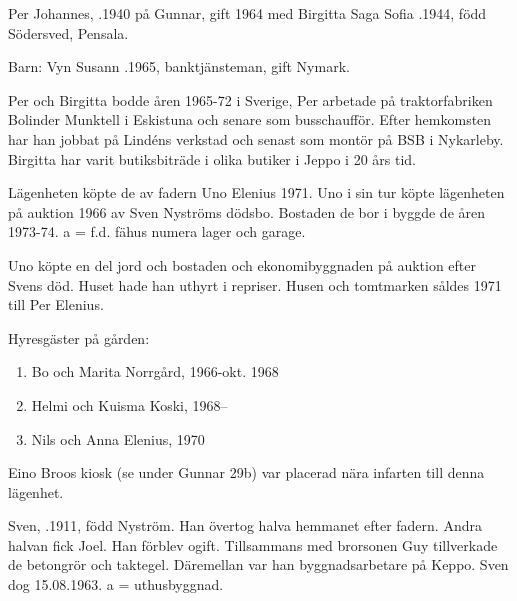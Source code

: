 
%
Per Johannes, .1940 på Gunnar, gift 1964 med Birgitta Saga Sofia .1944, född Södersved, Pensala.

Barn: Vyn Susann .1965, banktjänsteman, gift Nymark.

Per och Birgitta bodde åren 1965-72 i Sverige, Per arbetade på traktorfabriken Bolinder Munktell i Eskistuna och senare som busschaufför. Efter hemkomsten har han jobbat på Lindéns verkstad och senast som montör på BSB i Nykarleby. Birgitta har varit butiksbiträde i olika butiker i Jeppo i 20 års tid.

Lägenheten köpte de av fadern Uno Elenius 1971. Uno i sin tur köpte lägenheten på auktion 1966 av Sven Nyströms dödsbo. Bostaden de bor i byggde de åren 1973-74.  a = f.d. fähus numera lager och garage.



%



%
Uno köpte en del jord och bostaden och ekonomibyggnaden på auktion efter Svens död. Huset hade han uthyrt i repriser. Husen och tomtmarken såldes 1971 till Per Elenius.

Hyresgäster på gården:
\begin{enumerate}
  \item Bo och Marita Norrgård, 1966-okt. 1968
  \item Helmi och Kuisma Koski, 1968--
  \item Nils och Anna  Elenius, 1970
\end{enumerate}
Eino Broos kiosk (se under Gunnar 29b) var placerad nära infarten till denna lägenhet.

%
Sven, .1911, född Nyström. Han övertog halva hemmanet efter fadern. Andra halvan fick Joel. Han förblev ogift. Tillsammans med brorsonen Guy tillverkade de betongrör och taktegel. Däremellan var han byggnadsarbetare på Keppo. Sven dog 15.08.1963. a = uthusbyggnad.\jhvspace{}


